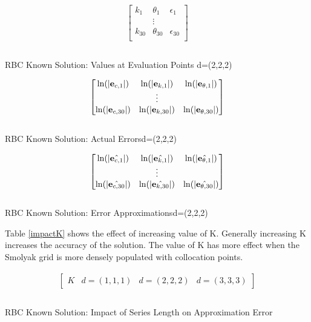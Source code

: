 \documentclass[12pt]{article}
\begin{document}
\begin{table}
  \centering
  
\begin{gather*}
  \begin{bmatrix}
    k_1&\theta_1&\epsilon_1\\
&\vdots\\
    k_{30}&\theta_{30}&\epsilon_{30}\\
  \end{bmatrix}\\
%  
\end{gather*}\\
  \caption{RBC Known Solution: Values at Evaluation Points \label{valatB}d=(2,2,2)}
\end{table}


 \begin{table}
    \centering
   \begin{gather*}
\forActErr\\
%  
   \end{gather*}\\
   \caption{RBC Known Solution: Actual Errors\label{acterrB}d=(2,2,2)}
 \end{table}

 \begin{table}
   \centering
  
   \begin{gather*}
\forEstErr\\
%   
   \end{gather*}\\
   \caption{RBC Known Solution: Error Approximations\label{esterrB}d=(2,2,2)}
 \end{table}


Table \ref{impactK} shows the effect of increasing value of K.  Generally
increasing K increases the accuracy of the solution.  The value of K has
more effect when the Smolyak grid is more densely populated with collocation
points.



 \begin{table}
   \centering
   \begin{gather*}
          \begin{bmatrix}
       K&d=(1,1,1)&d=(2,2,2)&d=(3,3,3)
     \end{bmatrix}\\
   \end{gather*}
   \begin{gather*}
%        
   \end{gather*}
   \caption{RBC Known Solution: Impact of Series Length on Approximation Error \label{impactK}}
 \end{table}
\end{document}
